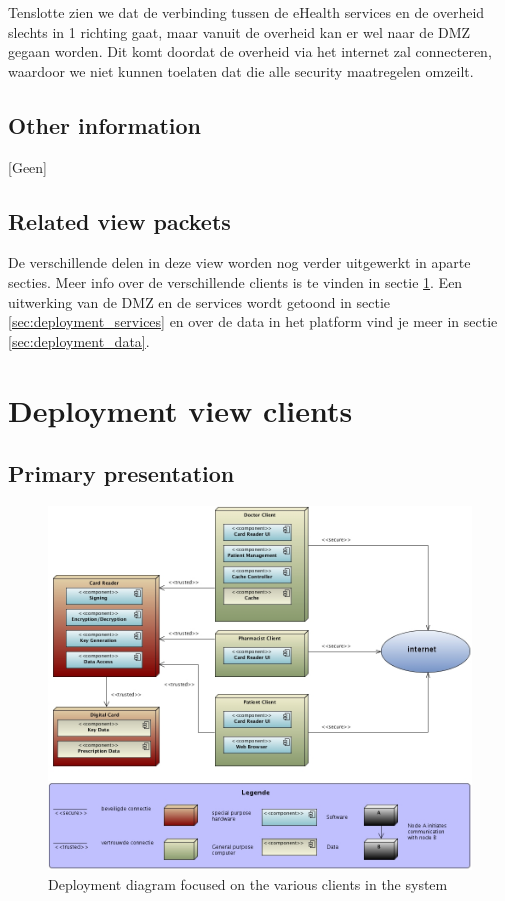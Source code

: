 \documentclass[a4paper,10pt]{article}
\begin{document}
Tenslotte zien we dat de verbinding tussen de eHealth services en de overheid slechts in 1 richting gaat, maar vanuit de overheid kan er wel naar de DMZ gegaan worden. Dit komt doordat de overheid via het internet zal connecteren, waardoor we niet kunnen toelaten dat die alle security maatregelen omzeilt.

\subsection{Other information}
[Geen]

\subsection{Related view packets}

De verschillende delen in deze view worden nog verder uitgewerkt in aparte secties. Meer info over de verschillende clients is te vinden in sectie \ref{sec:deployment_clients}. Een uitwerking van de DMZ en de services wordt getoond in sectie \ref{sec:deployment_services} en over de data in het platform vind je meer in sectie \ref{sec:deployment_data}.

\clearpage
\section{Deployment view clients}
\label{sec:deployment_clients}

\subsection{Primary presentation}
\begin{center}
    \begin{figure}[!h]
      \includegraphics[width=\textwidth]{../images/deployment_clients.jpg}
	\caption{Deployment diagram focused on the various clients in the system}
    \end{figure}
  \end{center}
\end{document}
